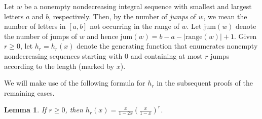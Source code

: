 \documentclass{article}
\theoremstyle{remark}
\theoremstyle{plain}
\newtheorem{lemma}[theorem]{Lemma}
\begin{document}
Let $w$ be a nonempty nondecreasing integral sequence  with smallest and largest letters $a$ and $b$, respectively.  Then, by the number of \emph{jumps} of $w$, we mean the number of letters in $[a,b]$ not occurring in the range of $w$.  Let $\text{jum}(w)$ denote the number of jumps of $w$ and hence $\text{jum}(w)=b-a-|\text{range}(w)|+1$.  Given $r \geq0$, let $h_r=h_r(x)$ denote the generating function that enumerates nonempty nondecreasing sequences starting with 0 and containing at most $r$ jumps according to the length (marked by $x$).

We will make use of the following formula for $h_r$ in the subsequent proofs of the remaining cases.

\begin{lemma}\label{1000lem}
If $r \geq0$, then $h_r(x)=\frac{x}{1-2x}\left(\frac{x}{1-x}\right)^r$.
\end{lemma}
\end{document}

